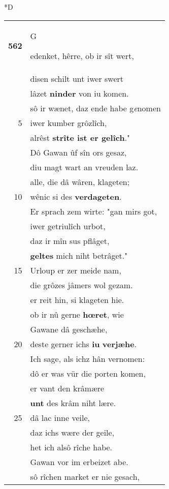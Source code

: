 \documentclass[8pt,a4paper,notitlepage]{article}
\begin{document}
\begin{table}[ht]
\begin{minipage}[t]{0.5\linewidth}
\small
\begin{center}*D
\end{center}
\begin{tabular}{rl}
\textbf{562} & \begin{large}G\end{large}edenket, hêrre, ob ir sît wert,\\ 
 & disen schilt unt iwer swert\\ 
 & lâzet \textbf{ninder} von iu komen.\\ 
 & sô ir wænet, daz ende habe g\textit{e}nomen\\ 
5 & iwer kumber grôzlîch,\\ 
 & alrêst \textbf{strîte ist er gelîch}."\\ 
 & Dô Gawan ûf sîn ors gesaz,\\ 
 & diu magt wart an vreuden laz.\\ 
 & alle, die dâ wâren, klageten;\\ 
10 & wênic si des \textbf{verdageten}.\\ 
 & Er sprach zem wirte: "gan mirs got,\\ 
 & iwer getriulîch urbot,\\ 
 & daz ir mîn sus pflâget,\\ 
 & \textbf{geltes} mich niht betrâget."\\ 
15 & Urloup er zer meide nam,\\ 
 & die grôzes jâmers wol gezam.\\ 
 & er reit hin, si klageten hie.\\ 
 & ob ir nû gerne \textbf{hœret}, wie\\ 
 & Gawane dâ geschæhe,\\ 
20 & deste gerner ichs \textbf{iu} \textbf{verjæhe}.\\ 
 & Ich sage, als ichz hân vernomen:\\ 
 & dô er was vür die porten komen,\\ 
 & er vant den krâmære\\ 
 & \textbf{unt} des krâm niht lære.\\ 
25 & dâ lac inne veile,\\ 
 & daz ichs wære der geile,\\ 
 & het ich alsô rîche habe.\\ 
 & Gawan vor im erbeizet abe.\\ 
 & sô rîchen market er nie gesach,\\ 

\end{tabular}
\end{minipage}
\end{table}
\end{document}
